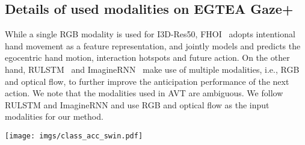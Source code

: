 \documentclass[10pt,twocolumn,letterpaper,dvipsnames]{article}
\newcommand{\sname}{AFFT}
\begin{document}
\subsection{Details of used modalities on EGTEA Gaze+}
While a single RGB modality is used for I3D-Res50, FHOI~\cite{liuForecastingHumanObjectInteraction2020} adopts intentional hand movement as a feature representation, and jointly models and predicts the egocentric hand motion, interaction hotspots and future action. On the other hand, RULSTM~\cite{furnariWhatWouldYou2019} and ImagineRNN~\cite{wuLearningAnticipateEgocentric2021} make use of multiple modalities, i.e., RGB and optical flow, to further improve the anticipation performance of the next action. We note that the modalities used in AVT are ambiguous. We follow RULSTM and ImagineRNN and use RGB and optical flow as the input modalities for our method.


\begin{figure*}[t]
    \centering
    \texttt{[image: imgs/class\_acc\_swin.pdf]}
    \caption{Per-class top-5 accuracy of fusion (\sname-Swin) and single modalities for the largest-25 actions in the validation set of EpicKitchens-100. The classes are presented in the order of sample frequency, from left to right. For most classes, the fusion method provides superior results to the single modalities.}
    \label{fig:class_acc_swin}
\end{figure*} 
\end{document}
